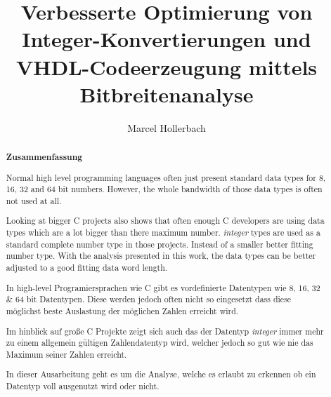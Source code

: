 \documentclass[parskip=full,12pt,a4paper,twoside,headings=openright]{scrreprt}
\title{Verbesserte Optimierung von Integer-Konvertierungen und VHDL-Codeerzeugung mittels Bitbreitenanalyse}
\author{Marcel Hollerbach}
\begin{document}
\begin{otherlanguage}{ngerman} %
\mytitlepage
\end{otherlanguage}

\begin{abstract}
\begin{center}\Huge\textbf{\textsf{Zusammenfassung}}
\end{center}
\vfill

Normal high level programming languages often just present standard data types for 8, 16, 32 and 64 bit numbers. However, the whole bandwidth of those data types is often not used at all. 

Looking at bigger C projects also shows that often enough C developers are using data types which are a lot bigger than there maximum number. \textit{integer} types are used as a standard complete number type in those projects. Instead of a smaller better fitting number type.
With the analysis presented in this work, the data types can be better adjusted to a good fitting data word length.
\vfill

In high-level Programiersprachen wie C gibt es vordefinierte Datentypen wie 8, 16, 32 \& 64 bit Datentypen. Diese werden jedoch often nicht so eingesetzt dass diese möglichst beste Auslastung der möglichen Zahlen erreicht wird.

Im hinblick auf große C Projekte zeigt sich auch das der Datentyp \textit{integer} immer mehr zu einem allgemein gültigen Zahlendatentyp wird, welcher jedoch so gut wie nie das Maximum seiner Zahlen erreicht.

In dieser Ausarbeitung geht es um die Analyse, welche es erlaubt zu erkennen ob ein Datentyp voll ausgenutzt wird oder nicht.

\end{abstract}

\tableofcontents









\end{document}
